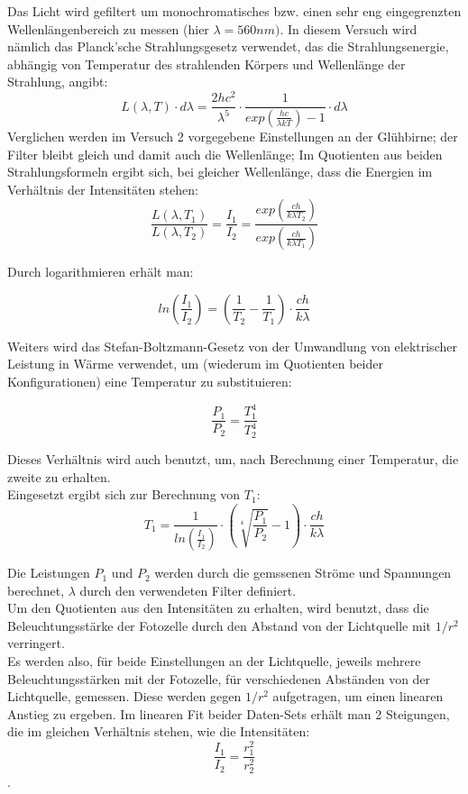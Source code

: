 \documentclass[12pt,a4paper]{article}
\begin{document}
\begin{multicols}{2}


Das Licht wird gefiltert um monochromatisches bzw. einen sehr eng eingegrenzten Wellenlängenbereich zu messen (hier $\lambda = 560nm)$. In diesem Versuch wird nämlich das Planck'sche Strahlungsgesetz verwendet, das die Strahlungsenergie, abhängig von Temperatur des strahlenden Körpers und Wellenlänge der Strahlung, angibt:
$$L(\lambda,T)\cdot d \lambda = \frac{2hc^2}{\lambda ^5}\cdot \frac{1}{exp(\frac{hc}{\lambda k T})-1}\cdot d\lambda$$
Verglichen werden im Versuch 2 vorgegebene Einstellungen an der Glühbirne; der Filter bleibt gleich und damit auch die Wellenlänge; Im Quotienten aus beiden Strahlungsformeln ergibt sich, bei gleicher Wellenlänge, dass die Energien im Verhältnis der Intensitäten stehen:
$$\frac{L(\lambda, T_1)}{L(\lambda, T_2)}=\frac{I_1}{I_2}=\frac{exp(\frac{ch}{k\lambda T_2})}{exp(\frac{ch}{k \lambda T_1})}$$

Durch logarithmieren erhält man:

$$ln(\frac{I_1}{I_2})=(\frac{1}{T_2}-\frac{1}{T_1})\cdot \frac{ch}{k\lambda}$$

Weiters wird das Stefan-Boltzmann-Gesetz von der Umwandlung von elektrischer Leistung in Wärme verwendet, um (wiederum im Quotienten beider Konfigurationen) eine Temperatur zu substituieren:

$$\frac{P_1}{P_2}=\frac{T_1^4}{T_2^4}$$

Dieses Verhältnis wird auch benutzt, um, nach Berechnung einer Temperatur, die zweite zu erhalten.\\
Eingesetzt ergibt sich zur Berechnung von $T_1$:
$$T_1=\frac{1}{ln(\frac{I_1}{I_2})}\cdot (\sqrt[4]{\frac{P_1}{P_2}}-1)\cdot \frac{ch}{k\lambda}$$


Die Leistungen $P_1$ und $P_2$ werden durch die gemssenen Ströme und Spannungen berechnet, 
$\lambda$ durch den verwendeten Filter definiert.\\
Um den Quotienten aus den Intensitäten zu erhalten, wird benutzt, dass die Beleuchtungsstärke der Fotozelle durch den Abstand von der Lichtquelle mit $1/r^2$ verringert.\\

Es werden also, für beide Einstellungen an der Lichtquelle, jeweils mehrere Beleuchtungsstärken mit der Fotozelle, für verschiedenen Abständen von der Lichtquelle, gemessen. Diese werden gegen $1/r^2$ aufgetragen, um einen linearen Anstieg zu ergeben. Im linearen Fit beider Daten-Sets erhält man 2 Steigungen, die im gleichen Verhältnis stehen, wie die Intensitäten:
$$\frac{I_1}{I_2}=\frac{r_1^2}{r_2^2}$$.




\end{multicols}
\end{document}
